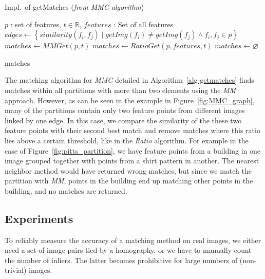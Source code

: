\documentclass{article}
\begin{document}
\begin{algorithm}
\caption{Impl.\ of getMatches (\emph{from MMC algorithm})}
\label{alg-getmatches}
    \fontsize{10}{10}\selectfont
    \begin{algorithmic}
    \Require $p$ : set of features, $t\in \mathbb{R}$, $features$ : Set of 
    all features
    \State $edges \gets \left\{similarity(f_i, f_j) \mid getImg(f_i)
        \neq getImg(f_j) \wedge f_i, f_j \in p \right\}$
        \State $matches \gets MMGet(p, t)$
        \State $matches \gets RatioGet(p, features, t)$
    \Else
        \State $matches \gets \varnothing$
    \EndIf

    \Return matches
    \end{algorithmic}
\end{algorithm}

The matching algorithm for \emph{MMC} detailed in 
Algorithm~\ref{alg-getmatches} finds matches within all partitions with 
more than two elements using the \emph{MM} approach.  However, as can be 
seen in the example in Figure~\ref{fig:MMC_graph}, many of the 
partitions contain only two feature points from different images linked 
by one edge. In this case, we compare the similarity of the these two 
feature points with their second best match and remove matches where 
this ratio lies above a certain threshold, like in the \emph{Ratio} 
algorithm.  For example in the case of Figure~\ref{fig:pitts_partition}, 
we have feature points from a building in one image grouped together 
with points from a shirt pattern in another.  The nearest neighbor 
method would have returned wrong matches, but since we match the 
partition with \emph{MM}, points in the building end up matching other 
points in the building, and no matches are returned.




\subsection{Experiments}
\label{S:Experiments}
%
To reliably measure the accuracy of a matching method on real images, we 
either need a set of image pairs tied by a homography, or we have to 
manually count the number of inliers. The latter becomes prohibitive for 
large numbers of (non-trivial) images. 
\end{document}
